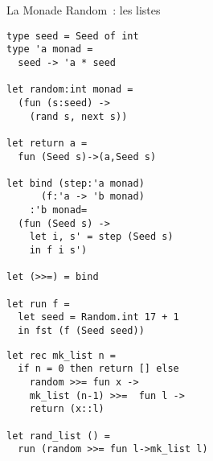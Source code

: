 \documentclass[10pt]{beamer}
\begin{document}
\begin{frame}[fragile]{La Monade Random~: les listes}
  \begin{multicols*}{2}
\begin{verbatim}
type seed = Seed of int
type 'a monad =
  seed -> 'a * seed

let random:int monad =
  (fun (s:seed) ->
    (rand s, next s))

let return a =
  fun (Seed s)->(a,Seed s)

let bind (step:'a monad)
      (f:'a -> 'b monad)
    :'b monad=
  (fun (Seed s) ->
    let i, s' = step (Seed s)
    in f i s')

let (>>=) = bind

let run f =
  let seed = Random.int 17 + 1
  in fst (f (Seed seed))
\end{verbatim}
    \columnbreak{}
\begin{verbatim}
let rec mk_list n =
  if n = 0 then return [] else
    random >>= fun x ->
    mk_list (n-1) >>=  fun l ->
    return (x::l)

let rand_list () =
  run (random >>= fun l->mk_list l)
\end{verbatim}
  \end{multicols*}
\end{frame}
\end{document}
